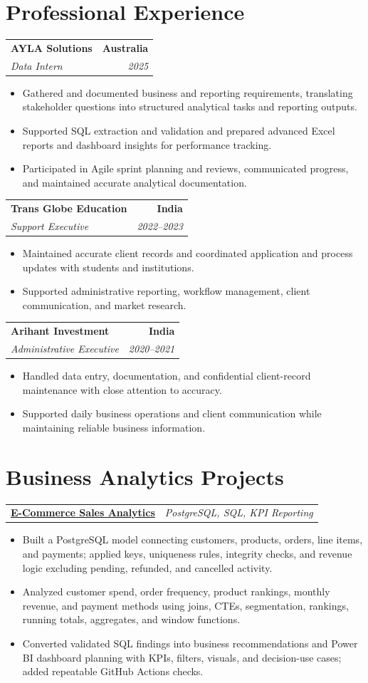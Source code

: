 \documentclass[letterpaper,10pt]{article}
\makeatletter
\newcommand{\role}[4]{%
  \begin{tabularx}{\textwidth}{@{}Xr@{}}
    \textbf{#1} & \textbf{#2} \\
    \textit{#3} & \textit{#4}
  \end{tabularx}\vspace{-1pt}
}
\newcommand{\project}[2]{%
  \begin{tabularx}{\textwidth}{@{}Xr@{}}
    \textbf{#1} & \textit{#2}
  \end{tabularx}\vspace{-1pt}
}
\makeatother
\begin{document}
\section{Professional Experience}
\role{AYLA Solutions}{Australia}{Data Intern}{2025}
\begin{itemize}
  \item Gathered and documented business and reporting requirements, translating stakeholder questions into structured analytical tasks and reporting outputs.
  \item Supported SQL extraction and validation and prepared advanced Excel reports and dashboard insights for performance tracking.
  \item Participated in Agile sprint planning and reviews, communicated progress, and maintained accurate analytical documentation.
\end{itemize}
\vspace{1pt}

\role{Trans Globe Education}{India}{Support Executive}{2022--2023}
\begin{itemize}
  \item Maintained accurate client records and coordinated application and process updates with students and institutions.
  \item Supported administrative reporting, workflow management, client communication, and market research.
\end{itemize}
\vspace{1pt}

\role{Arihant Investment}{India}{Administrative Executive}{2020--2021}
\begin{itemize}
  \item Handled data entry, documentation, and confidential client-record maintenance with close attention to accuracy.
  \item Supported daily business operations and client communication while maintaining reliable business information.
\end{itemize}

\section{Business Analytics Projects}
\project{\href{https://github.com/jainalimehta/Ecommerce-Sales-Analytics}{E-Commerce Sales Analytics}}{PostgreSQL, SQL, KPI Reporting}
\begin{itemize}
  \item Built a PostgreSQL model connecting customers, products, orders, line items, and payments; applied keys, uniqueness rules, integrity checks, and revenue logic excluding pending, refunded, and cancelled activity.
  \item Analyzed customer spend, order frequency, product rankings, monthly revenue, and payment methods using joins, CTEs, segmentation, rankings, running totals, aggregates, and window functions.
  \item Converted validated SQL findings into business recommendations and Power BI dashboard planning with KPIs, filters, visuals, and decision-use cases; added repeatable GitHub Actions checks.
\end{itemize}
\vspace{1pt}
\end{document}
